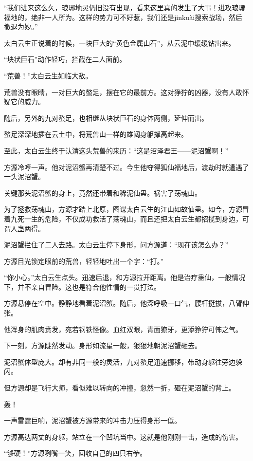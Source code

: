 \begin{this_body}
“我们进来这么久，琅琊地灵仍旧没有出现，看来这里真的发生了大事！进攻琅琊福地的，绝非一人所为。这样的势力可不好惹，我们还是jinkuài搜索战场，然后撤退为妙。”

太白云生正说着的时候，一块巨大的“黄色金属山石”，从云泥中缓缓钻出来。

“块状巨石”动作轻巧，拦截在二人面前。

“荒兽！”太白云生如临大敌。

荒兽没有眼睛，一对巨大的螯足，摆在它的最前方。这对狰狞的凶器，没有人敢怀疑它的威力。

随后，另外的九对螯足，也相继从块状巨石的身体两侧，延伸而出。

螯足深深地插在云土中，将荒兽山一样的雄阔身躯撑高起来。

至此，太白云生终于认清这头荒兽的来历：“这是沼泽君王——泥沼蟹啊！”

方源冷哼一声。他对泥沼蟹再清楚不过。今生他夺得狐仙福地后，渡劫时就遭遇了一头泥沼蟹。

关键那头泥沼蟹的身上，竟然还带着和稀泥仙蛊。祸害了荡魂山。

为了拯救荡魂山，方源才踏上北原，图谋太白云生的江山如故仙蛊。如今，方源冒着九死一生的危险，不仅成功救活了荡魂山，而且还把太白云生都招揽到身边，可谓人蛊两得。

泥沼蟹拦住了二人去路。太白云生停下身形，问方源道：“现在该怎么办？”

方源目光锁定眼前的荒兽，轻轻地吐出一个字：“打。”

“你小心。”太白云生点头。迅速后退，和方源拉开距离。他是治疗蛊仙，一般情况下，并不亲自冒险。这也是符合他性情的一贯打法。

方源悬停在空中。静静地看着泥沼蟹。随后，他深呼吸一口气，腰杆挺拔，八臂伸张。

他浑身的肌肉贲发，宛若钢铁怪像。血红双眼，青面獠牙，更添狰狞可怖之气。

下一刻，方源陡然发动。身形如流星一般，狠狠地朝泥沼蟹砸去。

泥沼蟹体型庞大。却有非同一般的灵活，九对螯足迅速挪移，带动身躯往旁边躲闪。

但方源却是飞行大师，看似难以转向的冲撞，忽然一折，砸在泥沼蟹的背上。

轰！

一声雷霆巨响，泥沼蟹被方源带来的冲击力压得身形一低。

方源高达两丈的身躯，站立在一个凹坑当中。这就是他刚刚一击，造成的伤害。

“够硬！”方源咧嘴一笑，回收自己的四只右拳。


\end{this_body}
